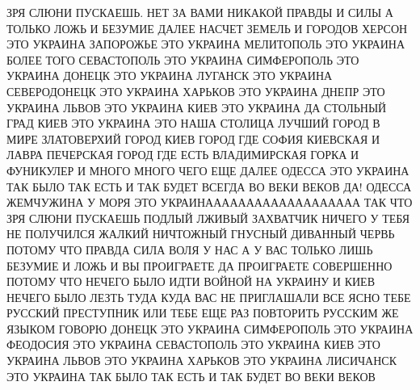 
 
 
 
 

ЗРЯ СЛЮНИ ПУСКАЕШЬ. НЕТ ЗА ВАМИ НИКАКОЙ ПРАВДЫ И СИЛЫ А ТОЛЬКО ЛОЖЬ И БЕЗУМИЕ
ДАЛЕЕ НАСЧЕТ ЗЕМЕЛЬ И ГОРОДОВ ХЕРСОН ЭТО УКРАИНА ЗАПОРОЖЬЕ ЭТО УКРАИНА
МЕЛИТОПОЛЬ ЭТО УКРАИНА БОЛЕЕ ТОГО СЕВАСТОПОЛЬ ЭТО УКРАИНА СИМФЕРОПОЛЬ ЭТО
УКРАИНА ДОНЕЦК ЭТО УКРАИНА ЛУГАНСК ЭТО УКРАИНА СЕВЕРОДОНЕЦК ЭТО УКРАИНА ХАРЬКОВ
ЭТО УКРАИНА ДНЕПР ЭТО УКРАИНА ЛЬВОВ ЭТО УКРАИНА КИЕВ ЭТО УКРАИНА ДА СТОЛЬНЫЙ
ГРАД КИЕВ ЭТО УКРАИНА ЭТО НАША СТОЛИЦА ЛУЧШИЙ ГОРОД В МИРЕ ЗЛАТОВЕРХИЙ ГОРОД
КИЕВ ГОРОД ГДЕ СОФИЯ КИЕВСКАЯ И ЛАВРА ПЕЧЕРСКАЯ ГОРОД ГДЕ ЕСТЬ ВЛАДИМИРСКАЯ
ГОРКА И ФУНИКУЛЕР И МНОГО МНОГО ЧЕГО ЕЩЕ ДАЛЕЕ ОДЕССА ЭТО УКРАИНА ТАК БЫЛО ТАК
ЕСТЬ И ТАК БУДЕТ ВСЕГДА ВО ВЕКИ ВЕКОВ ДА! ОДЕССА ЖЕМЧУЖИНА У МОРЯ ЭТО
УКРАИНААААААААААААААААААА ТАК ЧТО ЗРЯ СЛЮНИ ПУСКАЕШЬ ПОДЛЫЙ ЛЖИВЫЙ ЗАХВАТЧИК
НИЧЕГО У ТЕБЯ НЕ ПОЛУЧИЛСЯ ЖАЛКИЙ НИЧТОЖНЫЙ ГНУСНЫЙ ДИВАННЫЙ ЧЕРВЬ ПОТОМУ ЧТО
ПРАВДА СИЛА ВОЛЯ У НАС А У ВАС ТОЛЬКО ЛИШЬ БЕЗУМИЕ И ЛОЖЬ И ВЫ ПРОИГРАЕТЕ ДА
ПРОИГРАЕТЕ СОВЕРШЕННО ПОТОМУ ЧТО НЕЧЕГО БЫЛО ИДТИ ВОЙНОЙ НА УКРАИНУ И КИЕВ
НЕЧЕГО БЫЛО ЛЕЗТЬ ТУДА КУДА ВАС НЕ ПРИГЛАШАЛИ ВСЕ ЯСНО ТЕБЕ РУССКИЙ ПРЕСТУПНИК
ИЛИ ТЕБЕ ЕЩЕ РАЗ ПОВТОРИТЬ РУССКИМ ЖЕ ЯЗЫКОМ ГОВОРЮ ДОНЕЦК ЭТО УКРАИНА
СИМФЕРОПОЛЬ ЭТО УКРАИНА ФЕОДОСИЯ ЭТО УКРАИНА СЕВАСТОПОЛЬ ЭТО УКРАИНА КИЕВ ЭТО
УКРАИНА ЛЬВОВ ЭТО УКРАИНА ХАРЬКОВ ЭТО УКРАИНА ЛИСИЧАНСК ЭТО УКРАИНА ТАК БЫЛО
ТАК ЕСТЬ И ТАК БУДЕТ ВО ВЕКИ ВЕКОВ
